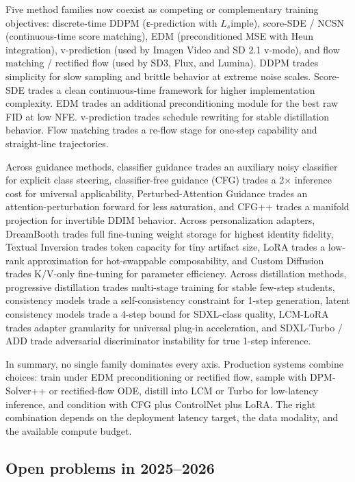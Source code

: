 \documentclass{article}
\begin{document}
Five method families now coexist as competing or complementary training objectives: discrete-time DDPM (ε-prediction with \(L_s\)imple), score-SDE / NCSN (continuous-time score matching), EDM (preconditioned MSE with Heun integration), v-prediction (used by Imagen Video and SD 2.1 v-mode), and flow matching / rectified flow (used by SD3, Flux, and Lumina). DDPM trades simplicity for slow sampling and brittle behavior at extreme noise scales. Score-SDE trades a clean continuous-time framework for higher implementation complexity. EDM trades an additional preconditioning module for the best raw FID at low NFE. v-prediction trades schedule rewriting for stable distillation behavior. Flow matching trades a re-flow stage for one-step capability and straight-line trajectories.

Across guidance methods, classifier guidance trades an auxiliary noisy classifier for explicit class steering, classifier-free guidance (CFG) trades a 2× inference cost for universal applicability, Perturbed-Attention Guidance trades an attention-perturbation forward for less saturation, and CFG++ trades a manifold projection for invertible DDIM behavior. Across personalization adapters, DreamBooth trades full fine-tuning weight storage for highest identity fidelity, Textual Inversion trades token capacity for tiny artifact size, LoRA trades a low-rank approximation for hot-swappable composability, and Custom Diffusion trades K/V-only fine-tuning for parameter efficiency. Across distillation methods, progressive distillation trades multi-stage training for stable few-step students, consistency models trade a self-consistency constraint for 1-step generation, latent consistency models trade a 4-step bound for SDXL-class quality, LCM-LoRA trades adapter granularity for universal plug-in acceleration, and SDXL-Turbo / ADD trade adversarial discriminator instability for true 1-step inference.

In summary, no single family dominates every axis. Production systems combine choices: train under EDM preconditioning or rectified flow, sample with DPM-Solver++ or rectified-flow ODE, distill into LCM or Turbo for low-latency inference, and condition with CFG plus ControlNet plus LoRA. The right combination depends on the deployment latency target, the data modality, and the available compute budget.

\subsection{Open problems in 2025--2026}\label{open-problems-in-20252026}
\end{document}
